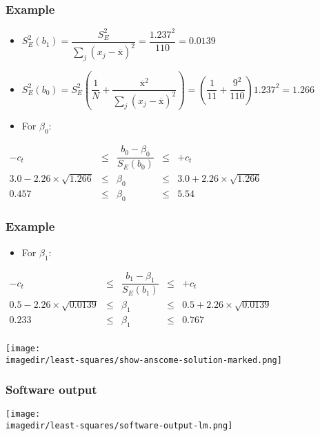 \begin{frame}\frametitle{Example}
	\begin{itemize}
		\item	$S_E^2(b_1) = \dfrac{S_E^2}{\sum_j{\left( x_j - \overline{\mathrm{x}} \right)^2}} = \dfrac{1.237^2}{110} = 0.0139$
		\item	$S_E^2(b_0) = S_E^2 \left(\dfrac{1}{N} + \dfrac{\overline{\mathrm{x}}^2}{\sum_j{\left( x_j - \overline{\mathrm{x}} \right)^2}} \right) = \left(\dfrac{1}{11} + \dfrac{9^2}{110} \right)1.237^2 = 1.266$
	\end{itemize}
	\begin{itemize}
		\item	For $\beta_0$:
	\end{itemize}
	$
	\begin{array}{rccclrcccl}
		- c_t &\leq& \dfrac{b_0 - \beta_0}{S_E(b_0)} &\leq & +c_t \\
		3.0 - 2.26 \times \sqrt{1.266} &\leq& \beta_0 &\leq& 3.0 + 2.26 \times \sqrt{1.266} \\
		0.457 &\leq& \beta_0 &\leq& 5.54
	\end{array}
	$
\end{frame}

\begin{frame}\frametitle{Example}
	\begin{itemize}
		\item	For $\beta_1$:
	\end{itemize}
	$
	\begin{array}{rccclrcccl}
		- c_t &\leq& \dfrac{b_1 - \beta_1}{S_E(b_1)} &\leq & +c_t \\
		0.5 - 2.26 \times \sqrt{0.0139} &\leq& \beta_1 &\leq& 0.5 + 2.26 \times \sqrt{0.0139}\\
		0.233 &\leq& \beta_1 &\leq& 0.767 \\
	\end{array}
	$
	\begin{center}
		\texttt{[image: \\imagedir/least-squares/show-anscome-solution-marked.png]}
	\end{center}
\end{frame}

\begin{frame}\frametitle{Software output}
	\begin{center}
		\texttt{[image: \\imagedir/least-squares/software-output-lm.png]}
	\end{center}
\end{frame}

